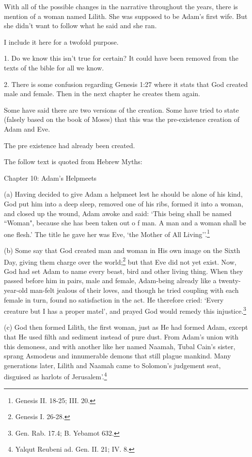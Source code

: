 \documentclass{article}
\begin{document}
With all of the possible changes in the narrative throughout the years, there is
mention of a woman named Lilith. She was supposed to be Adam's first wife. But
she didn't want to follow what he said and she ran.

I include it here for a twofold purpose.

1. Do we know this isn't true for certain? It could have been removed from the
texts of the bible for all we know.

2. There is some confusion regarding Genesis 1:27 where it stats that God
created male and female. Then in the next chapter he creates them again.

Some have said there are two versions of the creation. Some have tried to state
(falsely based on the book of Moses) that this was the pre-existence creation of
Adam and Eve.

The pre existence had already been created.

The follow text is quoted from Hebrew Myths\cite{myth}:

Chapter 10: Adam's Helpmeets

(a) Having decided to give Adam a helpmeet lest he should be alone
of his kind, God put him into a deep sleep, removed one of his
ribs, formed it into a woman, and closed up the wound, Adam awoke
and said: `This being shall be named ``Woman", because she has been
taken out o f man. A man and a woman shall be one flesh.' The
title he gave her was Eve, `the Mother of 
All Living''.\footnote{Genesis II. 18-25; III. 20.}

(b) Some say that God created man and woman in His own image on
the Sixth Day, giving them charge over the 
world;\footnote{Genesis I. 26-28.} but that Eve
did not yet exist. Now, God had set Adam to name every beast, bird
and other living thing. When they passed before him in pairs, male
and female, Adam-being already like a twenty-year-old man-felt
jealous of their loves, and though he tried coupling with each
female in turn, found no satisfaction in the act. He therefore
cried: `Every creature but I has a proper matel', and prayed God
would remedy this injustice.\footnote{Gen. Rab. 17.4; B. Yebamot 632.}

(c) God then formed Lilith, the first woman, just as He had
formed Adam, except that He used filth and sediment instead of
pure dust. From Adam's union with this demoness, and with another
like her named Naamah, Tubal Cain's sister, sprang Asmodeus and
innumerable demons that still plague mankind. Many generations
later, Lilith and Naamah came to Solomon's judgement seat,
disguised as harlots of 
Jerusalem'.\footnote{Yalqut Reubeni ad. Gen. II. 21; IV. 8.}
\end{document}
